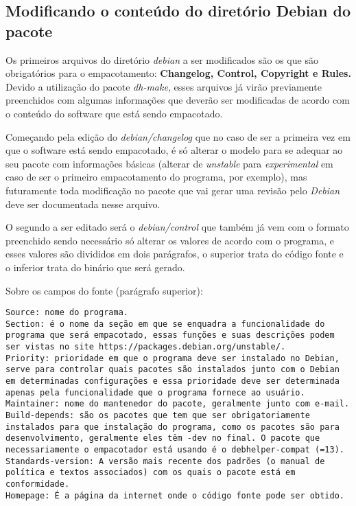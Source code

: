 \subsection{Modificando o conteúdo do diretório Debian do pacote}

Os primeiros arquivos do diretório \textit{debian} a ser modificados são os que são obrigatórios para o empacotamento:\textbf{ Changelog, Control, Copyright e Rules.} Devido a utilização do pacote \textit{dh-make}, esses arquivos já virão previamente preenchidos com algumas informações que deverão ser modificadas de acordo com o conteúdo do software que está sendo empacotado.

Começando pela edição do \textit{debian/changelog} que no caso de ser a primeira vez em que o software está sendo empacotado, é só alterar o modelo para se adequar ao seu pacote com informações básicas (alterar de \textit{unstable} para \textit{experimental} em caso de ser o primeiro empacotamento do programa, por exemplo), mas futuramente toda modificação no pacote que vai gerar uma revisão pelo \textit{Debian} deve ser documentada nesse arquivo. 

O segundo a ser editado será o\textit{ debian/control} que também já vem com o formato preenchido sendo necessário só alterar os valores de acordo com o programa, e esses valores são divididos em dois parágrafos, o superior trata do código fonte e o inferior trata do binário que será gerado.

Sobre os campos do fonte (parágrafo superior):
\begin{verbatim}
Source: nome do programa.
Section: é o nome da seção em que se enquadra a funcionalidade do programa que será empacotado, essas funções e suas descrições podem ser vistas no site https://packages.debian.org/unstable/.
Priority: prioridade em que o programa deve ser instalado no Debian, serve para controlar quais pacotes são instalados junto com o Debian em determinadas configurações e essa prioridade deve ser determinada apenas pela funcionalidade que o programa fornece ao usuário.
Maintainer: nome do mantenedor do pacote, geralmente junto com e-mail.
Build-depends: são os pacotes que tem que ser obrigatoriamente instalados para que instalação do programa, como os pacotes são para desenvolvimento, geralmente eles têm -dev no final. O pacote que necessariamente o empacotador está usando é o debhelper-compat (=13).
Standards-version: A versão mais recente dos padrões (o manual de política e textos associados) com os quais o pacote está em conformidade. 
Homepage: É a página da internet onde o código fonte pode ser obtido.
\end{verbatim}

